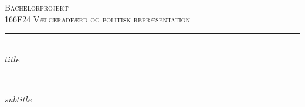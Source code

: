 %
%
%
%


	\newcommand{\HRule}{\rule{\linewidth}{0.5mm}} %

	\center %





	\vspace*{1cm}

	\textsc{\Large Bachelorprojekt}\\[0.5cm] %

	\textsc{\large 166F24 Vælgeradfærd og politisk repræsentation}\\[0.5cm] %


	\vfill


	\HRule\\[0.5cm]

	\vspace*{0.5cm}
	{\huge\bfseries $title$}\\[0.4cm] %
	\rule{7cm}{0.5mm}\\
	\vspace*{1cm}
	{\Large\bfseries $subtitle$}\\[0.4cm] %
	\vspace*{0.5cm}

